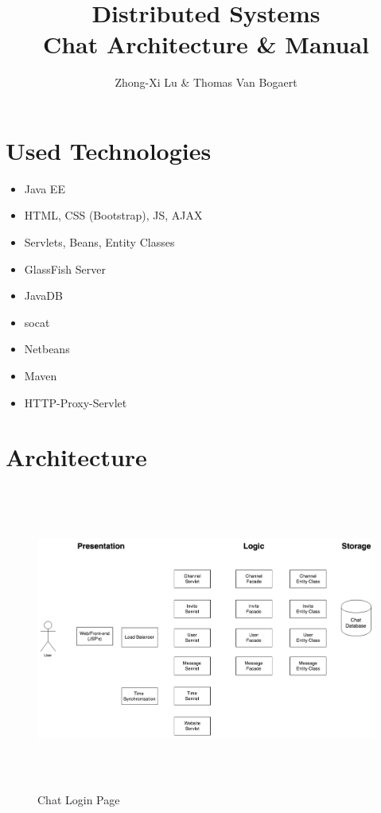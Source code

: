 \documentclass[11pt]{article}
\begin{document}
\author{Zhong-Xi Lu \& Thomas Van Bogaert}
\title{\textbf{Distributed Systems} \\ \Large{Chat Architecture \& Manual}}
\date{}
\maketitle

\section{Used Technologies}

\begin{itemize}
	\item Java EE
	\item HTML, CSS (Bootstrap), JS, AJAX
	\item Servlets, Beans, Entity Classes
	\item GlassFish Server
	\item JavaDB
	\item socat
	\item Netbeans
	\item Maven
	\item HTTP-Proxy-Servlet
\end{itemize}

\section{Architecture}

\begin{figure}[H]
\centering
\includegraphics[height=100mm]{architecture.png}
\caption{Chat Login Page}
\end{figure}
\end{document}
